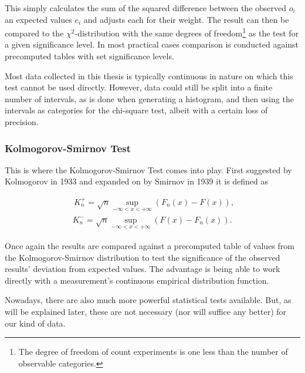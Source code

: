 This simply calculates the sum of the squared difference between the observed $o_i$ an expected values $e_i$ and adjusts each for their weight. The result can then be compared to the $\chi^2$-distribution with the same degrees of freedom\footnote{The degree of freedom of count experiments is one less than the number of observable categories.} as the test for a given significance level. In most practical cases comparison is conducted against precomputed tables with set significance levels.

Most data collected in this thesis is typically continuous in nature on which this test cannot be used directly. However, data could still be split into a finite number of intervals, as is done when generating a histogram, and then using the intervals as categories for the chi-square test, albeit with a certain loss of precision.


\subsubsection{Kolmogorov-Smirnov Test}

This is where the Kolmogorov-Smirnov Test comes into play. First suggested by Kolmogorov in 1933 \cite{kolmogorov1933sulla} and expanded on by Smirnov in 1939 \cite{smirnov1939estimation} it is defined as

\begin{equation}
	\begin{aligned}
	\phantom{,}K_n^+ = \sqrt{n} \sup_{-\infty < x < + \infty} \left( F_n(x) - F(x) \right), \\
	\phantom{.}K_n^- = \sqrt{n} \sup_{-\infty < x < + \infty} \left( F(x) - F_n(x) \right).
	\end{aligned}
\end{equation}

Once again the results are compared against a precomputed table of values from the Kolmogorov-Smirnov distribution to test the significance of the observed results' deviation from expected values. The advantage is being able to work directly with a measurement's continuous empirical distribution function.

Nowadays, there are also much more powerful statistical tests available. But, as will be explained later, these are not necessary (nor will suffice any better) for our kind of data.



